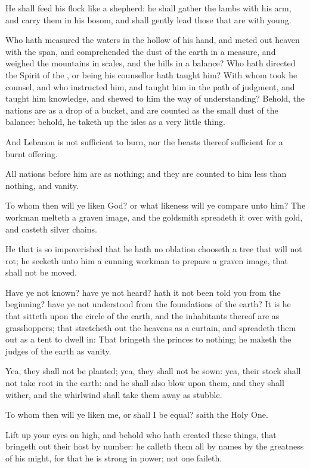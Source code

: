 \Verse He shall feed his flock like a shepherd: he shall gather the lambs with his arm, and carry them in his bosom, and shall gently lead those that are with young.

\Verse Who hath measured the waters in the hollow of his hand, and meted out heaven with the span, and comprehended the dust of the earth in a measure, and weighed the mountains in scales, and the hills in a balance?  \Verse Who hath directed the Spirit of the \LORD, or being his counsellor hath taught him?  \Verse With whom took he counsel, and who instructed him, and taught him in the path of judgment, and taught him knowledge, and shewed to him the way of understanding?  \Verse Behold, the nations are as a drop of a bucket, and are counted as the small dust of the balance: behold, he taketh up the isles as a very little thing.

\Verse And Lebanon is not sufficient to burn, nor the beasts thereof sufficient for a burnt offering.

\Verse All nations before him are as nothing; and they are counted to him less than nothing, and vanity.

\Verse To whom then will ye liken God? or what likeness will ye compare unto him?  \Verse The workman melteth a graven image, and the goldsmith spreadeth it over with gold, and casteth silver chains.

\Verse He that is so impoverished that he hath no oblation chooseth a tree that will not rot; he seeketh unto him a cunning workman to prepare a graven image, that shall not be moved.

\Verse Have ye not known? have ye not heard? hath it not been told you from the beginning? have ye not understood from the foundations of the earth?  \Verse It is he that sitteth upon the circle of the earth, and the inhabitants thereof are as grasshoppers; that stretcheth out the heavens as a curtain, and spreadeth them out as a tent to dwell in: \Verse That bringeth the princes to nothing; he maketh the judges of the earth as vanity.

\Verse Yea, they shall not be planted; yea, they shall not be sown: yea, their stock shall not take root in the earth: and he shall also blow upon them, and they shall wither, and the whirlwind shall take them away as stubble.

\Verse To whom then will ye liken me, or shall I be equal? saith the Holy One.

\Verse Lift up your eyes on high, and behold who hath created these things, that bringeth out their host by number: he calleth them all by names by the greatness of his might, for that he is strong in power; not one faileth.

